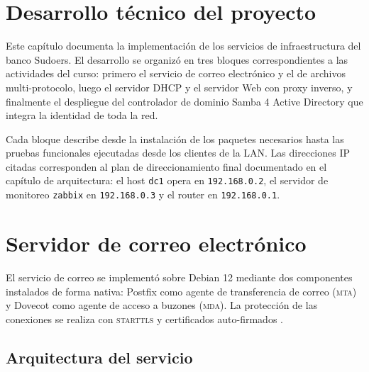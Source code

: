 
\section{Desarrollo t\'ecnico del proyecto}

Este cap\'itulo documenta la implementaci\'on de los servicios de
infraestructura del banco Sudoers. El desarrollo se organiz\'o en tres
bloques correspondientes a las actividades del curso: primero el servicio de
correo electr\'onico y el de archivos multi-protocolo, luego el servidor DHCP
y el servidor Web con proxy inverso, y finalmente el despliegue del
controlador de dominio Samba 4 Active Directory que integra la identidad de
toda la red.

Cada bloque describe desde la instalaci\'on de los paquetes necesarios hasta
las pruebas funcionales ejecutadas desde los clientes de la LAN. Las
direcciones IP citadas corresponden al plan de direccionamiento final
documentado en el cap\'itulo de arquitectura: el host \texttt{dc1} opera en
\texttt{192.168.0.2}, el servidor de monitoreo \texttt{zabbix} en
\texttt{192.168.0.3} y el router en \texttt{192.168.0.1}.

\section{Servidor de correo electr\'onico}

El servicio de correo se implement\'o sobre Debian 12 mediante dos
componentes instalados de forma nativa: Postfix como agente de
transferencia de correo (\textsc{mta}) y Dovecot como agente de acceso a
buzones (\textsc{mda}). La protecci\'on de las conexiones se realiza con
\textsc{starttls} y certificados auto-firmados \cite{postel1982}.

\subsection{Arquitectura del servicio}

